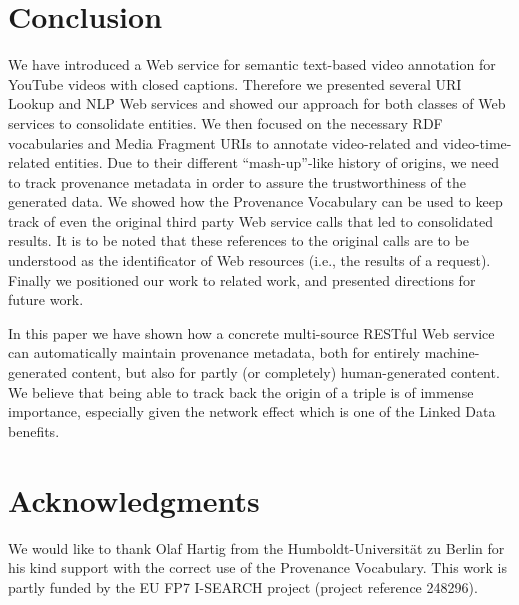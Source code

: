 \documentclass{acm_proc_article-sp}
\begin{document}
\section{Conclusion}\label{sec:conclusion}
We have introduced a Web service for semantic text-based video annotation for YouTube videos with closed captions. Therefore we presented several URI Lookup and NLP Web services and showed our approach for both classes of Web services to consolidate entities. We then focused on the necessary RDF vocabularies and Media Fragment URIs to annotate video-related and video-time-related entities. Due to their different ``mash-up''-like history of origins, we need to track provenance metadata in order to assure the trustworthiness of the generated data. We showed how the Provenance Vocabulary can be used to keep track of even the original third party Web service calls that led to consolidated results. It is to be noted that these references to the original calls are to be understood as the identificator of Web resources (i.e., the results of a request). Finally we positioned our work to related work, and presented directions for future work.

In this paper we have shown how a concrete multi-source RESTful Web service can automatically maintain provenance metadata, both for entirely machine-generated content, but also for partly (or completely) human-generated content. We believe that being able to track back the origin of a triple is of immense importance, especially given the network effect which is one of the Linked Data benefits.


\section{Acknowledgments}\label{sec:acknowledgments}
We would like to thank Olaf Hartig from the Humboldt-Universit\"{a}t zu Berlin for his kind support with the correct use of the Provenance Vocabulary. This work is partly funded by the EU FP7 I-SEARCH project (project reference 248296).

%

%
%
\appendix
\end{document}
